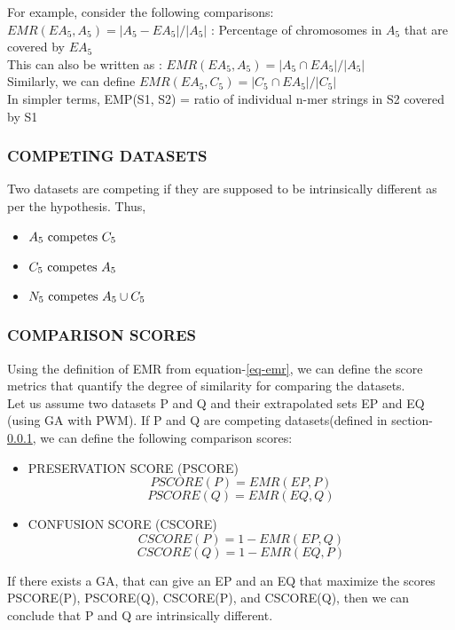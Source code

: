\documentclass[12pt,a4paper]{article}
\begin{document}
	For example, consider the following comparisons:\\
	$ EMR(EA_5, A_5) = |A_5 - EA_5| / |A_5| $ : Percentage of chromosomes in $A_5$ that are covered by $EA_5$ \\
	This can also be written as : $ EMR(EA_5, A_5) = |A_5 \cap EA_5| / |A_5| $ \\
	Similarly, we can define $ EMR(EA_5, C_5) = |C_5 \cap EA_5| / |C_5| $ \\
	In simpler terms, EMP(S1, S2) = ratio of individual n-mer strings in S2 covered by S1

	\subsubsection{COMPETING DATASETS} \label{sec:competing}
	Two datasets are competing if they are supposed to be intrinsically different as per the hypothesis.
	Thus,
	\begin{itemize}
	\item $A_5 \textnormal{ competes } C_5$
	\item $C_5 \textnormal{ competes } A_5$
	\item $N_5 \textnormal{ competes } A_5 \cup C_5$
	\end{itemize}

	\subsubsection{COMPARISON SCORES} \label{scores}
	Using the definition of EMR from equation-\ref{eq-emr}, we can define the score metrics that quantify the degree of similarity for comparing the datasets.\\
	Let us assume two datasets P and Q and their extrapolated sets EP and EQ (using GA with PWM). If P and Q are competing datasets(defined in section-\ref{sec:competing}, we can define the following comparison scores:
	\begin{itemize}
		\item PRESERVATION SCORE (PSCORE)
		\begin{equation}
			PSCORE(P) = EMR(EP, P)
			\label{eq-pscore}
		\end{equation}
		\begin{equation}
			PSCORE(Q) = EMR(EQ, Q)
		\end{equation}
		\item CONFUSION SCORE (CSCORE)
		\begin{equation}
			CSCORE(P) = 1 - EMR(EP, Q)
			\label{eq-cscore}
		\end{equation}
		\begin{equation}
			CSCORE(Q) = 1 - EMR(EQ, P)
		\end{equation}
	\end{itemize}
	If there exists a GA, that can give an EP and an EQ that maximize the scores PSCORE(P), PSCORE(Q), CSCORE(P), and CSCORE(Q), then we can conclude that P and Q are intrinsically different.
	
\end{document}
